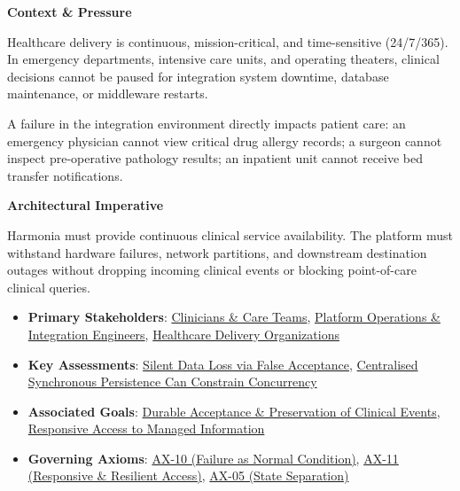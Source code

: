 \par\medskip\textbf{Context \& Pressure}\par


Healthcare delivery is continuous, mission-critical, and time-sensitive (24/7/365). In emergency departments, intensive care units, and operating theaters, clinical decisions cannot be paused for integration system downtime, database maintenance, or middleware restarts.



A failure in the integration environment directly impacts patient care: an emergency physician cannot view critical drug allergy records; a surgeon cannot inspect pre-operative pathology results; an inpatient unit cannot receive bed transfer notifications.



\par\medskip\textbf{Architectural Imperative}\par


Harmonia must provide continuous clinical service availability. The platform must withstand hardware failures, network partitions, and downstream destination outages without dropping incoming clinical events or blocking point-of-care clinical queries.



\begin{itemize}


\item \textbf{Primary Stakeholders}: \href{\detokenize{../../../../../docs/markdown/01-motivation/stakeholders/enterprise-stakeholders.md}}{Clinicians \& Care Teams}, \href{\detokenize{../../../../../docs/markdown/01-motivation/stakeholders/enterprise-stakeholders.md}}{Platform Operations \& Integration Engineers}, \href{\detokenize{../../../../../docs/markdown/01-motivation/stakeholders/enterprise-stakeholders.md}}{Healthcare Delivery Organizations}

\item \textbf{Key Assessments}: \href{\detokenize{../../../../../docs/markdown/01-motivation/drivers-assessments/assessments.md}}{Silent Data Loss via False Acceptance}, \href{\detokenize{../../../../../docs/markdown/01-motivation/drivers-assessments/assessments.md}}{Centralised Synchronous Persistence Can Constrain Concurrency}

\item \textbf{Associated Goals}: \href{\detokenize{../../../../../docs/markdown/01-motivation/goals-outcomes/strategic-goals.md}}{Durable Acceptance \& Preservation of Clinical Events}, \href{\detokenize{../../../../../docs/markdown/01-motivation/goals-outcomes/strategic-goals.md}}{Responsive Access to Managed Information}

\item \textbf{Governing Axioms}: \hyperref[element:0d9673833eb840eab03804aa076c1b0c]{AX-10 (Failure as Normal Condition)}, \hyperref[element:8a1e995f16954484a78ae1c5c114d546]{AX-11 (Responsive \& Resilient Access)}, \hyperref[element:0412a2084f0145babc4f022c71fea65f]{AX-05 (State Separation)}

\end{itemize}

